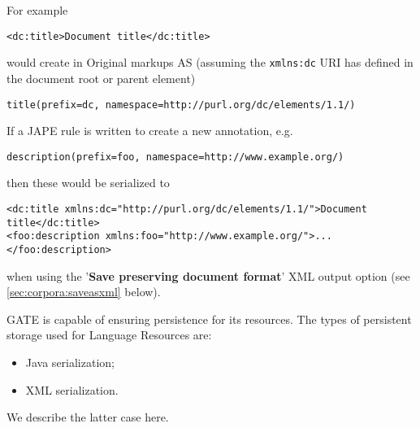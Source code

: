 For example

\begin{small}
\begin{verbatim}<dc:title>Document title</dc:title>\end{verbatim}
\end{small}
  
would create in Original markups AS (assuming the {\tt xmlns:dc} URI has defined in the document root or parent element)

\begin{small}
\begin{verbatim}title(prefix=dc, namespace=http://purl.org/dc/elements/1.1/)\end{verbatim} 
\end{small}

If a JAPE rule is written to create a new annotation, e.g.

\begin{small}
\begin{verbatim}description(prefix=foo, namespace=http://www.example.org/)\end{verbatim} 
\end{small}

then these would be serialized to

\begin{small}
\begin{verbatim}
<dc:title xmlns:dc="http://purl.org/dc/elements/1.1/">Document title</dc:title>
<foo:description xmlns:foo="http://www.example.org/">...</foo:description>
\end{verbatim}   
\end{small}

when using the '\textbf{Save preserving document format}' XML output option (see \ref{sec:corpora:saveasxml} below).  

  

GATE is capable of ensuring persistence for its resources.
The types of persistent
storage used for Language Resources are:
\begin{itemize}
\item Java serialization;
\item XML serialization.
\end{itemize}
We describe the latter case here.

